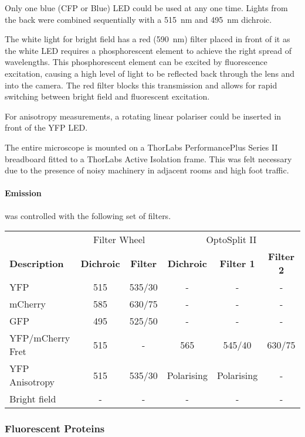 \documentclass[../main.tex]{subfiles}
\begin{document}
Only one blue (CFP or Blue) LED could be used at any one time. Lights from the back were combined sequentially with a \SI{515}{\nano\meter} and \SI{495}{\nano\meter} dichroic.

The white light for bright field has a red (\SI{590}{\nano\meter}) filter placed in front of it as the white LED requires a phosphorescent element to achieve the right spread of wavelengths. This phosphorescent element can be excited by fluorescence excitation, causing a high level of light to be reflected back through the lens and into the camera. The red filter blocks this transmission and allows for rapid switching between bright field and fluorescent excitation.

For anisotropy measurements, a rotating linear polariser could be inserted in front of the YFP LED.

The entire microscope is mounted on a ThorLabs PerformancePlus Series II breadboard fitted to a ThorLabs Active Isolation frame. This was felt necessary due to the presence of noisy machinery in adjacent rooms and high foot traffic.

\paragraph{Emission} was controlled with the following set of filters.
\begin{center}
\begin{tabular}{l|c|c|c|c|c}
&	\multicolumn{2}{c|}{Filter Wheel}	&	\multicolumn{3}{c}{OptoSplit II}	\\
\textbf{Description}	&	\textbf{Dichroic}	&	\textbf{Filter}		& \textbf{Dichroic}	&	\textbf{Filter 1}	&	\textbf{Filter 2}	\\\hline
YFP		&	515		&	535/30	&	-	&	-	&	-	\\
mCherry	&	585		&	630/75	&	-	&	-	&	-	\\
GFP		&	495		&	525/50	&	-	&	-	&	-	\\
YFP/mCherry Fret	&	515	&	-	&	565	&	545/40	&	630/75	\\
YFP Anisotropy	&	515	&	535/30	&	Polarising	&	Polarising	&	-	\\
Bright field		&	-	&	-	&	-	&	-	&	-	
\end{tabular}
\end{center}

\subsubsection{Fluorescent Proteins}
\end{document}
